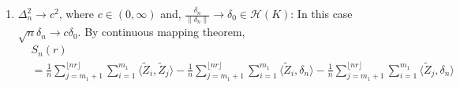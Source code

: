 \documentclass[11pt]{article}
\newcommand{\bP}{\mathbb{P}}
\theoremstyle{plain}
\theoremstyle{definition}
\theoremstyle{remark}
\begin{document}
\begin{appendix}
\begin{enumerate}
\begin{align*}
        &+(t-m_1) m_1\left\|\delta_n\right\|^2\\\
        &-\frac{t-m_1}{m_2}\Bigg(\sum_{j=m_1+1}^{n}\sum_{i=1}^{m_1} \langle \tilde{Z}_i,\tilde{Z}_j\rangle-\sum_{j=m_1+1}^{n}\sum_{i=1}^{m_1}\langle \tilde{Z}_i,\delta_n\rangle\\
        &-\sum_{j=m_1+1}^{n}\sum_{i=1}^{m_1}\langle \tilde{Z}_j, \delta_n\rangle +m_2 m_1\left\|\delta_n\right\|^2\Bigg)\Bigg)^2\allowdisplaybreaks\\
        &=\frac{1}{n^2 m_2} \sum_{t=m_1+1}^n\Bigg( \underbrace{\left(\sum_{j=m_1+1}^{n}\sum_{i=1}^{m_1} \langle \tilde{Z}_i,\tilde{Z}_j\rangle-\frac{t-m_1}{m_2}\sum_{j=m_1+1}^{n}\sum_{i=1}^{m_1} \langle \tilde{Z}_i,\tilde{Z}_j\rangle\right)}_{=A_n(t/n)}\\
        &+\underbrace{m_1 \left\langle \delta_n, \left(\sum_{j=m_1+1}^{t}\tilde{Z}_j-\frac{t-m_1}{m_2}\sum_{j=m_1+1}^{n}\tilde{Z}_j\right)\right\rangle}_{=B_n(t/n)}\Bigg)^2\leq \frac{2}{n^2 m_2}\sum_{t=m_1+1}^n (A^2_n(t/n)+B^2_n(t/n)).
            \end{align*}
    It's not difficult to see that under Assumption 2, a direct application of continuous mapping theorem gives us
    \begin{align*}
        \frac{1}{n^3 m_2\left\|\delta_n\right\|^2}\sum_{t=m_1+1}^nA^2_n(t/n)=O_{\bP}(1),
    \end{align*}
    and 
    \begin{align*}
        \frac{1}{n^3 m_2\left\|\delta_n\right\|^2}\sum_{t=m_1+1}^nB^2_n(t/n)=O_{\bP}(1).
    \end{align*}
 Therefore,
    $$\frac{1}{m_2}\sum_{t=m_1+1}^n\left(S_n(\frac{t}{n})-\frac{t-m_1}{m_2}S_n(1)\right)^2=O_P(\Delta_n^2).$$
    Hence,
    \begin{align*}
        \sqrt{m_2}\cdot U_n =\frac{S_n(1)}{\sqrt{\frac{1}{m_2}\sum_{t=m_1+1}^n\left(S_n(\frac{t}{n})-\frac{t-m_1}{m_2}S_n(1)\right)^2}}\overset{\bP}{\to} \infty,
    \end{align*}
   which implies that $\bP(\sqrt{m_2}\cdot U_n>U_{1-\alpha})\to 1.$
    \item $\Delta_n^2 \to c^2$, where $c \in (0,\infty)$ and, $\frac{\delta_n}{\left\|\delta_n\right\|}\to \delta_0 \in \mathcal{H}(K)$: In this case $\sqrt{n}\delta_n \to c \delta_0$. By continuous mapping theorem,
    \begin{align*}
        &S_n(r)
        \\
        &=\frac{1}{n}\sum_{j=m_1+1}^{\lfloor nr \rfloor}\sum_{i=1}^{m_1} \langle \tilde{Z}_i,\tilde{Z}_j\rangle-\frac{1}{n}\sum_{j=m_1+1}^{\lfloor nr \rfloor}\sum_{i=1}^{m_1}\langle \tilde{Z}_i,\delta_n\rangle-\frac{1}{n}\sum_{j=m_1+1}^{\lfloor nr \rfloor}\sum_{i=1}^{m_1}\langle \tilde{Z}_j, \delta_n\rangle\\

\end{align*}
\end{enumerate}
\end{appendix}
\end{document}
